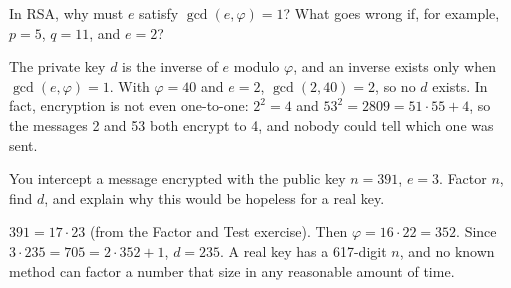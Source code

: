\begin{Exercise}[title={Why Coprime?}, label=nt_coprime]
In RSA, why must $e$ satisfy $\gcd(e, \varphi) = 1$? What goes wrong if, for
example, $p = 5$, $q = 11$, and $e = 2$?
\end{Exercise}
\begin{Answer}[ref=nt_coprime]
The private key $d$ is the inverse of $e$ modulo $\varphi$, and an inverse exists
only when $\gcd(e, \varphi) = 1$. With $\varphi = 40$ and $e = 2$, $\gcd(2, 40) = 2$,
so no $d$ exists. In fact, encryption is not even one-to-one: $2^2 = 4$ and
$53^2 = 2809 = 51 \cdot 55 + 4$, so the messages 2 and 53 both encrypt to 4, and
nobody could tell which one was sent.
\end{Answer}

\begin{Exercise}[title={Breaking a Small Key}, label=nt_break]
You intercept a message encrypted with the public key $n = 391$, $e = 3$. Factor
$n$, find $d$, and explain why this would be hopeless for a real key.
\end{Exercise}
\begin{Answer}[ref=nt_break]
$391 = 17 \cdot 23$ (from the Factor and Test exercise). Then
$\varphi = 16 \cdot 22 = 352$. Since $3 \cdot 235 = 705 = 2 \cdot 352 + 1$,
$d = 235$. A real key has a 617-digit $n$, and no known method can factor a
number that size in any reasonable amount of time.
\end{Answer}

